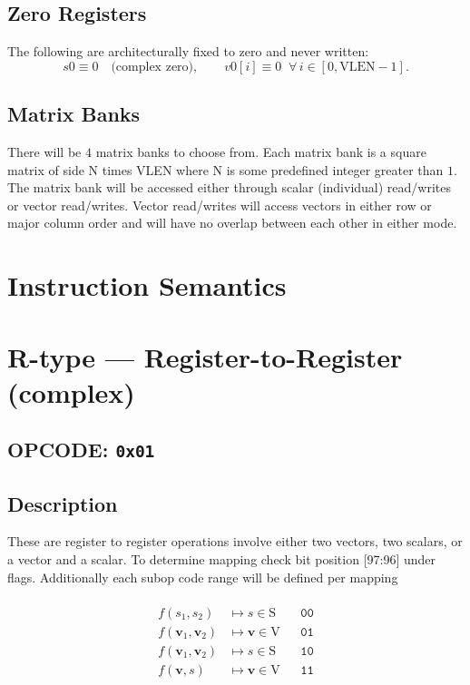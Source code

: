 \documentclass[10pt]{article}
\begin{document}
\subsection*{Zero Registers}
\noindent The following are architecturally fixed to zero and never written:
\[
s0 \equiv 0\quad\text{(complex zero)}, \qquad
v0[i] \equiv 0\;\; \forall\, i \in [0,\mathrm{VLEN}-1].
\]

\subsection*{Matrix Banks}
There will be $4$ matrix banks to choose from. Each matrix bank is a square matrix of side N times VLEN where N is some predefined integer greater than $1$. The matrix bank will be accessed either through scalar (individual) read/writes or vector read/writes. Vector read/writes will access vectors in either row or major column order and will have no overlap between each other in either mode.


\clearpage
\section*{Instruction Semantics}

\section*{R-type — Register-to-Register (complex)}
\subsection*{OPCODE: \texttt{0x01}}
\subsection*{Description}

These are register to register operations involve either two vectors, two scalars, or a vector and a scalar. To determine mapping check bit position [97:96] under flags. Additionally each subop code range will be defined per mapping\\\\

\[
\begin{aligned}
f(s_1,s_2)                  &\mapsto s \in \mathrm{S}            && \texttt{00} \\
f(\mathbf v_1,\mathbf v_2)  &\mapsto \mathbf v \in \mathrm{V}    && \texttt{01} \\
f(\mathbf v_1,\mathbf v_2)  &\mapsto s \in \mathrm{S}            && \texttt{10} \\
f(\mathbf v,s)              &\mapsto \mathbf v \in \mathrm{V}    && \texttt{11} \\
\end{aligned}
\]
\end{document}
